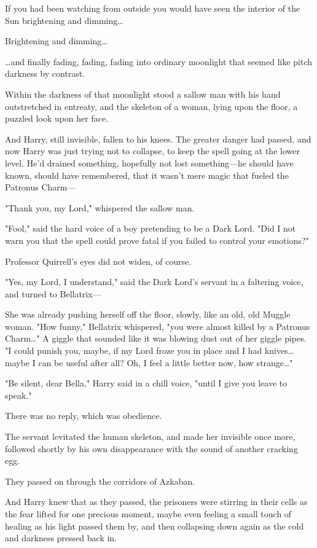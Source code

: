 If you had been watching from outside you would have seen the interior of the
Sun brightening and dimming…

Brightening and dimming…

…and finally fading, fading, fading into ordinary moonlight that seemed
like pitch darkness by contrast.

Within the darkness of that moonlight stood a sallow man with his hand
outstretched in entreaty, and the skeleton of a woman, lying upon the floor, a
puzzled look upon her face.

And Harry, still invisible, fallen to his knees. The greater danger had passed,
and now Harry was just trying not to collapse, to keep the spell going at the
lower level. He'd drained something, hopefully not lost something---he
should have known, should have remembered, that it wasn't mere magic that
fueled the Patronus Charm---

"Thank you, my Lord," whispered the sallow man.

"Fool," said the hard voice of a boy pretending to be a Dark Lord. "Did I not
warn you that the spell could prove fatal if you failed to control your
emotions?"

Professor Quirrell's eyes did not widen, of course.

"Yes, my Lord, I understand," said the Dark Lord's servant in a faltering
voice, and turned to Bellatrix---

She was already pushing herself off the floor, slowly, like an old, old Muggle
woman. "How funny," Bellatrix whispered, "you were almost killed by a Patronus
Charm…" A giggle that sounded like it was blowing dust out of her giggle
pipes. "I could punish you, maybe, if my Lord froze you in place and I had
knives…maybe I can be useful after all? Oh, I feel a little better now,
how strange…"

"Be silent, dear Bella," Harry said in a chill voice, "until I give you leave
to speak."

There was no reply, which was obedience.

The servant levitated the human skeleton, and made her invisible once more,
followed shortly by his own disappearance with the sound of another cracking
egg.

They passed on through the corridors of Azkaban.

And Harry knew that as they passed, the prisoners were stirring in their cells
as the fear lifted for one precious moment, maybe even feeling a small touch of
healing as his light passed them by, and then collapsing down again as the cold
and darkness pressed back in.

